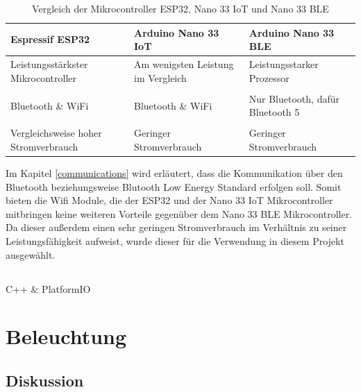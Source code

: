         \begin{table}[H]
            \caption{Vergleich der Mikrocontroller ESP32, Nano 33 IoT und Nano 33 BLE}
            \centering
            \begin{tabularx}{\textwidth}{  X | X | X  }
                \textbf{Espressif ESP32} & \textbf{Arduino Nano 33 IoT} & \textbf{Arduino Nano 33 BLE}\\ [0.5ex] \hline\hline
                Leistungsstärkster Mikrocontroller &
                Am wenigsten Leistung im Vergleich &
                Leistungsstarker Prozessor\\
                &&\\
                Bluetooth \& WiFi &
                Bluetooth \& WiFi &
                Nur Bluetooth, dafür Bluetooth 5 \\
                &&\\
                Vergleichsweise hoher Stromverbrauch &
                Geringer Stromverbrauch &
                Geringer Stromverbrauch \\
            \end{tabularx}
            \label{tab:compare_mics}
        \end{table}

        Im Kapitel \ref{communications} wird erläutert, dass die Kommunikation über den Bluetooth beziehungsweise Blutooth Low Energy Standard erfolgen soll. Somit bieten die Wifi Module, die der ESP32 und der Nano 33 IoT Mikrocontroller mitbringen keine weiteren Vorteile gegenüber dem Nano 33 BLE Mikrocontroller. Da dieser außerdem einen sehr geringen Stromverbrauch im Verhältnis zu seiner Leistungsfähigkeit aufweist, wurde dieser für die Verwendung in diesem Projekt ausgewählt.

    \subsection{}
        C++ \& PlatformIO

\section{Beleuchtung}
    \subsection{Diskussion}

